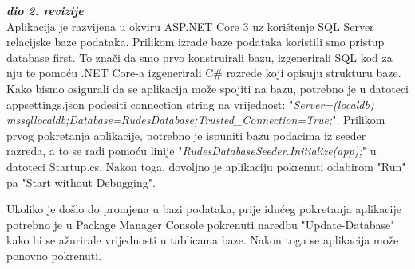 			\textbf{\textit{dio 2. revizije}}\\
			 
			 \textnormal{Aplikacija je razvijena u okviru ASP.NET Core 3 uz korištenje SQL Server relacijske baze podataka. Prilikom izrade baze podataka koristili smo pristup database first. To znači da smo prvo konstruirali bazu, izgenerirali SQL kod za nju te pomoću .NET Core-a izgenerirali C\# razrede koji opisuju strukturu baze. Kako bismo osigurali da se aplikacija može spojiti na bazu, potrebno je u datoteci appsettings.json podesiti connection string na vrijednost: "\textit{Server=(localdb)\\mssqllocaldb;Database=RudesDatabase;Trusted\_Connection=True;}". Prilikom prvog pokretanja aplikacije, potrebno je ispuniti bazu podacima iz seeder razreda, a to se radi pomoću linije "\textit{RudesDatabaseSeeder.Initialize(app);}" u datoteci Startup.cs. Nakon toga, dovoljno je aplikaciju pokrenuti odabirom "Run" pa "Start without Debugging".}
			 
			 \textnormal{Ukoliko je došlo do promjena u bazi podataka, prije idućeg pokretanja aplikacije potrebno je u Package Manager Console pokrenuti naredbu "Update-Database" kako bi se ažurirale vrijednosti u tablicama baze. Nakon toga se aplikacija može ponovno pokrenuti.}		
			
			\eject 